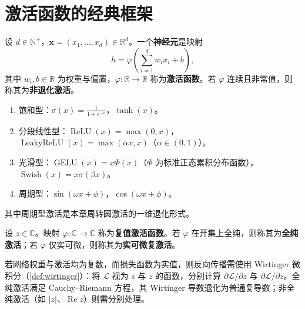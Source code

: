 \section{激活函数的经典框架}

\begin{definition}[逐点标量激活函数]\label{def:scalar-activation}
设 $d\in\mathbb N^+$，$\mathbf x=(x_1,\dots,x_d)\in\mathbb R^d$。一个\textbf{神经元}是映射
\[
h=\varphi\left(\sum_{i=1}^{d}w_i x_i+b\right),
\]
其中 $w_i,b\in\mathbb R$ 为权重与偏置，$\varphi:\mathbb R\to\mathbb R$ 称为\textbf{激活函数}。若 $\varphi$ 连续且非常值，则称其为\textbf{非退化激活}。
\end{definition}

\begin{example}[经典激活函数]\label{ex:classical-activations}
\begin{enumerate}[label=(\roman*)]
    \item 饱和型：$\sigma(x)=\frac{1}{1+e^{-x}}$，$\tanh(x)$。
    \item 分段线性型：$\operatorname{ReLU}(x)=\max(0,x)$，$\operatorname{LeakyReLU}(x)=\max(\alpha x,x)$（$\alpha\in(0,1)$）。
    \item 光滑型：$\operatorname{GELU}(x)=x\Phi(x)$（$\Phi$ 为标准正态累积分布函数），$\operatorname{Swish}(x)=x\sigma(\beta x)$。
    \item 周期型：$\sin(\omega x+\phi)$，$\cos(\omega x+\phi)$。
\end{enumerate}
其中周期型激活是本章周转圆激活的一维退化形式。
\end{example}

\begin{definition}[复值激活函数]\label{def:complex-activation}
设 $z\in\mathbb C$。映射 $\varphi:\mathbb C\to\mathbb C$ 称为\textbf{复值激活函数}。若 $\varphi$ 在开集上全纯，则称其为\textbf{全纯激活}；若 $\varphi$ 仅实可微，则称其为\textbf{实可微复激活}。
\end{definition}

\begin{remark}[复值激活的微积分边界]\label{rem:complex-activation-calculus}
若网络权重与激活均为复数，而损失函数为实值，则反向传播需使用 Wirtinger 微积分（\cref{def:wirtinger}）：将 $\mathcal L$ 视为 $z$ 与 $\bar z$ 的函数，分别计算 $\partial\mathcal L/\partial z$ 与 $\partial\mathcal L/\partial\bar z$。全纯激活满足 Cauchy–Riemann 方程，其 Wirtinger 导数退化为普通复导数；非全纯激活（如 $|z|$、$\operatorname{Re}z$）则需分别处理。
\end{remark}

